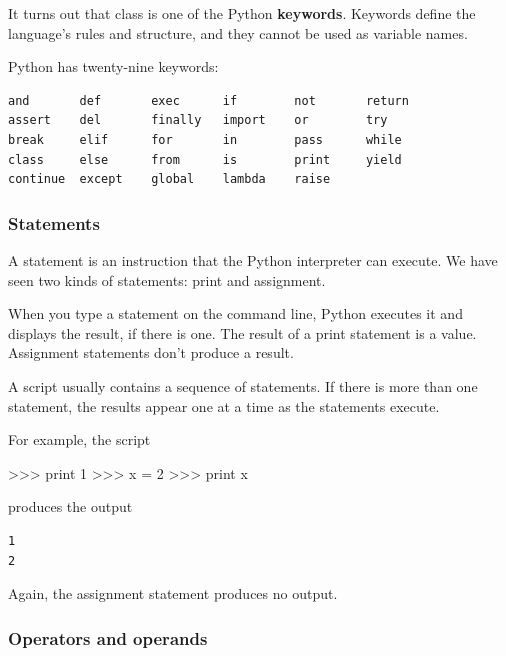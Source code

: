 \documentclass[11pt]{article}
\newenvironment{Shaded}{}{}
\newcommand{\DecValTok}[1]{\textcolor[rgb]{0.25,0.63,0.44}{{#1}}}
\newcommand{\NormalTok}[1]{{#1}}
\newcommand{\OperatorTok}[1]{\textcolor[rgb]{0.40,0.40,0.40}{{#1}}}
\newcommand{\BuiltInTok}[1]{{#1}}
\begin{document}
    It turns out that class is one of the Python \textbf{keywords}. Keywords
define the language's rules and structure, and they cannot be used as
variable names.

Python has twenty-nine keywords:

\begin{verbatim}
and       def       exec      if        not       return 
assert    del       finally   import    or        try 
break     elif      for       in        pass      while 
class     else      from      is        print     yield 
continue  except    global    lambda    raise 
\end{verbatim}

    \subsubsection{Statements}\label{statements}

A statement is an instruction that the Python interpreter can execute.
We have seen two kinds of statements: print and assignment.

When you type a statement on the command line, Python executes it and
displays the result, if there is one. The result of a print statement is
a value. Assignment statements don't produce a result.

A script usually contains a sequence of statements. If there is more
than one statement, the results appear one at a time as the statements
execute.

For example, the script

\begin{Shaded}
\begin{Highlighting}[]
\OperatorTok{>>>} \BuiltInTok{print} \DecValTok{1} 
\OperatorTok{>>>}\NormalTok{ x }\OperatorTok{=} \DecValTok{2} 
\OperatorTok{>>>} \BuiltInTok{print}\NormalTok{ x }
\end{Highlighting}
\end{Shaded}

produces the output

\begin{verbatim}
1 
2 
\end{verbatim}

Again, the assignment statement produces no output.

    \subsubsection{Operators and operands}\label{operators-and-operands}
\end{document}

